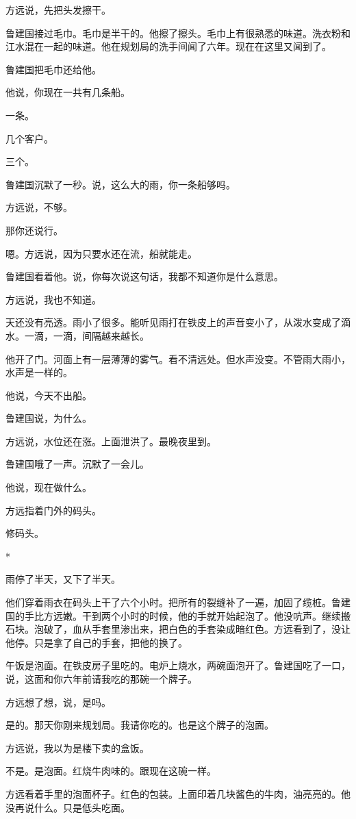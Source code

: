 \documentclass[UTF8,a5paper,11pt,openany]{ctexbook}
\newcommand{\scene}{\vspace{1em}\begin{center}*\quad*\quad*\end{center}\vspace{0.5em}}
\begin{document}
方远说，先把头发擦干。

鲁建国接过毛巾。毛巾是半干的。他擦了擦头。毛巾上有很熟悉的味道。洗衣粉和江水混在一起的味道。他在规划局的洗手间闻了六年。现在在这里又闻到了。

鲁建国把毛巾还给他。

他说，你现在一共有几条船。

一条。

几个客户。

三个。

鲁建国沉默了一秒。说，这么大的雨，你一条船够吗。

方远说，不够。

那你还说行。

嗯。方远说，因为只要水还在流，船就能走。

鲁建国看着他。说，你每次说这句话，我都不知道你是什么意思。

方远说，我也不知道。

天还没有亮透。雨小了很多。能听见雨打在铁皮上的声音变小了，从泼水变成了滴水。一滴，一滴，间隔越来越长。

他开了门。河面上有一层薄薄的雾气。看不清远处。但水声没变。不管雨大雨小，水声是一样的。

他说，今天不出船。

鲁建国说，为什么。

方远说，水位还在涨。上面泄洪了。最晚夜里到。

鲁建国哦了一声。沉默了一会儿。

他说，现在做什么。

方远指着门外的码头。

修码头。


\scene

雨停了半天，又下了半天。

他们穿着雨衣在码头上干了六个小时。把所有的裂缝补了一遍，加固了缆桩。鲁建国的手比方远嫩。干到两个小时的时候，他的手就开始起泡了。他没吭声。继续搬石块。泡破了，血从手套里渗出来，把白色的手套染成暗红色。方远看到了，没让他停。只是拿了自己的手套，把他的换了。

午饭是泡面。在铁皮房子里吃的。电炉上烧水，两碗面泡开了。鲁建国吃了一口，说，这面和你六年前请我吃的那碗一个牌子。

方远想了想，说，是吗。

是的。那天你刚来规划局。我请你吃的。也是这个牌子的泡面。

方远说，我以为是楼下卖的盒饭。

不是。是泡面。红烧牛肉味的。跟现在这碗一样。

方远看着手里的泡面杯子。红色的包装。上面印着几块酱色的牛肉，油亮亮的。他没再说什么。只是低头吃面。
\end{document}
